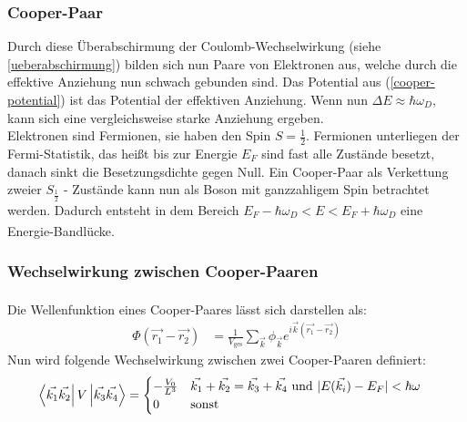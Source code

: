 \documentclass[12pt]{article}
\begin{document}
\subsubsection{Cooper-Paar}
Durch diese Überabschirmung der Coulomb-Wechselwirkung (siehe \ref{ueberabschirmung}) bilden sich nun Paare von Elektronen aus, welche durch die effektive Anziehung nun schwach gebunden sind. Das Potential aus (\ref{cooper-potential}) ist das Potential der effektiven Anziehung. Wenn nun $\Delta E\approx\hbar\omega_D$, kann sich eine vergleichsweise starke Anziehung ergeben.\\

Elektronen sind Fermionen, sie haben den Spin $S=\frac12$. Fermionen unterliegen der Fermi-Statistik, das heißt bis zur Energie $E_F$ sind fast alle Zustände besetzt, danach sinkt die Besetzungsdichte gegen Null.
Ein Cooper-Paar als Verkettung zweier $S_\frac12$ - Zustände kann nun als Boson mit ganzzahligem Spin betrachtet werden. Dadurch entsteht in dem Bereich $E_F-\hbar\omega_D<E<E_F+\hbar\omega_D$ eine Energie-Bandlücke.\textsuperscript{\cite{anleitung}}
\subsubsection{Wechselwirkung zwischen Cooper-Paaren}
Die Wellenfunktion eines Cooper-Paares lässt sich darstellen als: \textsuperscript{\cite{anleitung}}
\begin{align}
	\Phi(\vec{r_1}-\vec{r_2})&=\frac1{V_{\mathrm{ges}}}\sum_{\vec k}\phi_{\vec k}e^{i\vec k(\vec{r_1}-\vec{r_2})}
\end{align}
Nun wird folgende Wechselwirkung zwischen zwei Cooper-Paaren definiert:
\begin{align}
	\bra{\vec{k_1}\vec{k_2}}V\ket{\vec{k_3}\vec{k_4}}&=\begin{cases}-\frac{V_0}{L^3}&\vec{k_1}+\vec{k_2}=\vec{k_3}+\vec{k_4} \text{ und }|E(\vec{k_i})-E_F|<\hbar\omega\\0&\text{sonst}\end{cases}
\end{align}
\end{document}
